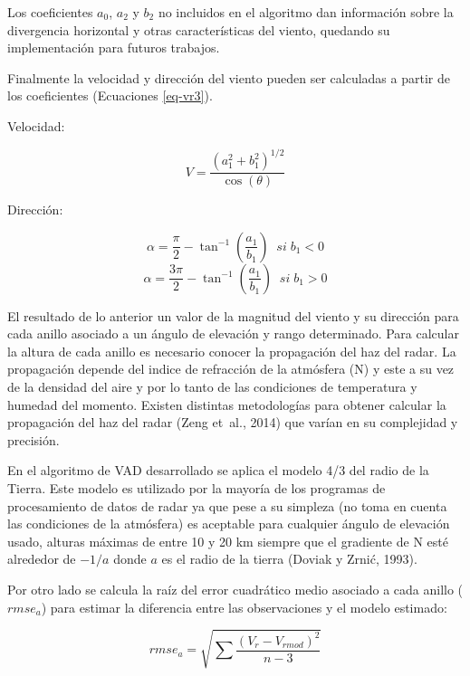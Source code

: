 \documentclass[12pt,spanish,oneside]{book}
\begin{document}
Los coeficientes \(a_0\), \(a_2\) y \(b_2\) no incluidos en el algoritmo
dan información sobre la divergencia horizontal y otras características
del viento, quedando su implementación para futuros trabajos.

Finalmente la velocidad y dirección del viento pueden ser calculadas a
partir de los coeficientes (Ecuaciones \ref{eq-vr3}).

Velocidad:

\begin{equation}
\label{eq-vr5}
V = \frac{(a_{1}^{2} + b_{1}^{2})^{1/2}}{\cos(\theta)}
\end{equation}

Dirección:

\begin{equation}\label{eq-vr6}
\alpha = \frac{\pi}{2}-\tan^{-1}(\frac{a_1}{b_1}) \; \; si \; b_1 < 0 
\end{equation}\begin{equation}\label{eq-vr7}
\alpha = \frac{3\pi}{2}-\tan^{-1}(\frac{a_1}{b_1}) \; \; si \; b_1 > 0
\end{equation}

El resultado de lo anterior un valor de la magnitud del viento y su
dirección para cada anillo asociado a un ángulo de elevación y rango
determinado. Para calcular la altura de cada anillo es necesario conocer
la propagación del haz del radar. La propagación depende del indice de
refracción de la atmósfera (N) y este a su vez de la densidad del aire y
por lo tanto de las condiciones de temperatura y humedad del momento.
Existen distintas metodologías para obtener calcular la propagación del
haz del radar (Zeng et~al., 2014) que varían en su complejidad y
precisión.

En el algoritmo de VAD desarrollado se aplica el modelo 4/3 del radio de
la Tierra. Este modelo es utilizado por la mayoría de los programas de
procesamiento de datos de radar ya que pese a su simpleza (no toma en
cuenta las condiciones de la atmósfera) es aceptable para cualquier
ángulo de elevación usado, alturas máximas de entre 10 y 20 km siempre
que el gradiente de N esté alrededor de \(-1/a\) donde \(a\) es el radio
de la tierra (Doviak y Zrnić, 1993).

Por otro lado se calcula la raíz del error cuadrático medio asociado a
cada anillo (\(rmse_a\)) para estimar la diferencia entre las
observaciones y el modelo estimado:

\begin{equation}\label{eq-vr8}
rmse_a = \sqrt {\sum \frac {(V_r - V_{rmod} )^2} {n-3}}
\end{equation}
\end{document}
